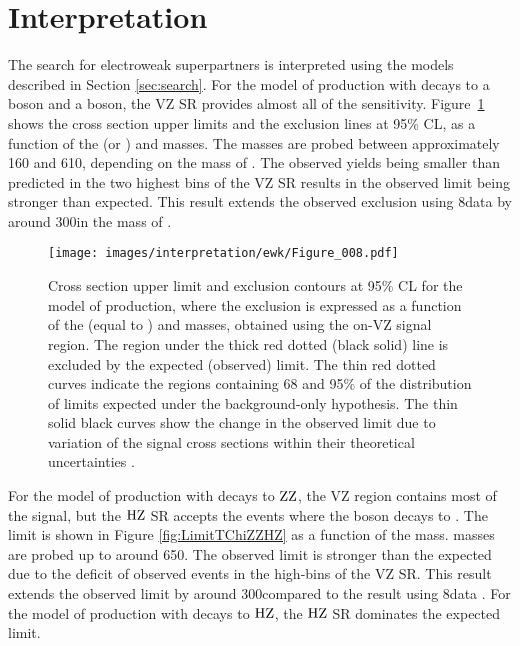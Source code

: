\section{Interpretation}
\noindent
\justify
The search for electroweak superpartners is interpreted using the models described in Section \ref{sec:search}.
For the model of \firstcharg\secondchi production with decays to a \PZ boson and a \PW boson, the VZ SR provides almost all of the sensitivity.
Figure~\ref{fig:LimitTChiWZ} shows the cross section upper limits and the exclusion lines at 95\% CL, as a function of the \firstcharg (or \secondchi) and \firstchi masses.
The \firstcharg masses are probed between approximately 160 and 610\GeV, depending on the mass of \firstchi.
The observed yields being smaller than predicted in the two highest \ptmiss bins of the VZ SR results in the observed limit being stronger than expected.
This result extends the observed exclusion using 8\TeV data by around 300\GeV in the mass of \firstcharg \cite{Khachatryan:2015lwa}.
\begin{figure}[hb]
 \centering
   \texttt{[image: images/interpretation/ewk/Figure\_008.pdf]}
   \caption{\label{fig:LimitTChiWZ}
Cross section upper limit and exclusion contours at 95\% CL for the model of \firstcharg\secondchi production, where the exclusion is expressed as a function of the \firstcharg (equal to \secondchi) and \firstchi masses, obtained using the on-\PZ VZ signal region.
The region under the thick red dotted (black solid) line is excluded by the expected (observed) limit.
The thin red dotted curves indicate the regions containing 68 and 95\% of the distribution of limits expected under the background-only hypothesis.
The thin solid black curves show the change in the observed limit due to variation of the signal cross sections within their theoretical uncertainties \cite{Sirunyan:2017qaj}.}
\end{figure}
\newpara
\noindent\justify
For the model of \firstchi\firstchi production with decays to $\mathrm{Z}\mathrm{Z}$, the VZ region contains most of the signal, but the $\mathrm{H}\mathrm{Z}$ SR accepts the events where the \PZ boson decays to \bbbar.
The limit is shown in Figure \ref{fig:LimitTChiZZHZ} as a function of the \firstchi mass.  
\firstchi masses are probed up to around 650\GeV.
The observed limit is stronger than the expected due to the deficit of observed events in the high-\ptmiss bins of the VZ SR.
This result extends the observed limit by around 300\GeV compared to the result using 8\TeV data \cite{Khachatryan:2015lwa}.
For the model of \firstchi\firstchi production with decays to $\mathrm{H}\mathrm{Z}$, the $\mathrm{H}\mathrm{Z}$ SR dominates the expected limit.
